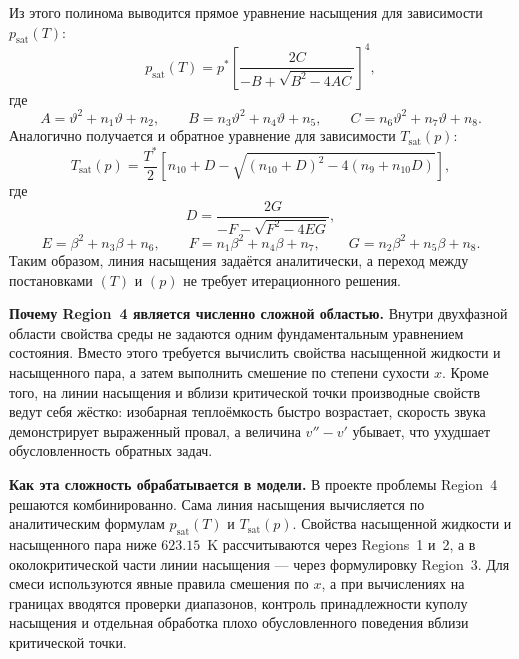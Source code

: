 Из этого полинома выводится прямое уравнение насыщения
для зависимости $p_{\mathrm{sat}}(T)$:
\begin{equation}
p_{\mathrm{sat}}(T) = p^{*}
\left[
\frac{2C}{-B + \sqrt{B^{2} - 4AC}}
\right]^{4},
\end{equation}
где
\begin{equation}
A = \vartheta^{2} + n_{1}\vartheta + n_{2},
\qquad
B = n_{3}\vartheta^{2} + n_{4}\vartheta + n_{5},
\qquad
C = n_{6}\vartheta^{2} + n_{7}\vartheta + n_{8}.
\end{equation}
Аналогично получается и обратное уравнение
для зависимости $T_{\mathrm{sat}}(p)$:
\begin{equation}
T_{\mathrm{sat}}(p) = \frac{T^{*}}{2}
\left[
n_{10} + D - \sqrt{(n_{10}+D)^{2} - 4(n_{9} + n_{10}D)}
\right],
\end{equation}
где
\begin{equation}
D = \frac{2G}{-F - \sqrt{F^{2} - 4EG}},
\end{equation}
\begin{equation}
E = \beta^{2} + n_{3}\beta + n_{6},
\qquad
F = n_{1}\beta^{2} + n_{4}\beta + n_{7},
\qquad
G = n_{2}\beta^{2} + n_{5}\beta + n_{8}.
\end{equation}
Таким образом, линия насыщения
задаётся аналитически,
а переход между постановками $(T)$ и $(p)$
не требует итерационного решения.

\noindent\textbf{Почему Region~4 является численно сложной областью.}
Внутри двухфазной области свойства среды
не задаются одним фундаментальным уравнением состояния.
Вместо этого требуется вычислить свойства насыщенной жидкости
и насыщенного пара,
а затем выполнить смешение по степени сухости $x$.
Кроме того, на линии насыщения и вблизи критической точки
производные свойств ведут себя жёстко:
изобарная теплоёмкость быстро возрастает,
скорость звука демонстрирует выраженный провал,
а величина $v''-v'$ убывает,
что ухудшает обусловленность обратных задач.

\noindent\textbf{Как эта сложность обрабатывается в модели.}
В проекте проблемы Region~4 решаются комбинированно.
Сама линия насыщения вычисляется по аналитическим формулам
$p_{\mathrm{sat}}(T)$ и $T_{\mathrm{sat}}(p)$.
Свойства насыщенной жидкости и насыщенного пара
ниже $623.15$~K рассчитываются через Regions~1 и~2,
а в околокритической части линии насыщения ---
через формулировку Region~3.
Для смеси используются явные правила смешения по $x$,
а при вычислениях на границах вводятся проверки диапазонов,
контроль принадлежности куполу насыщения
и отдельная обработка плохо обусловленного поведения
вблизи критической точки.

